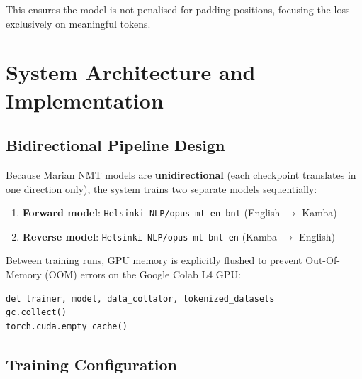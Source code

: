\documentclass[12pt,a4paper]{article}
\begin{document}
This ensures the model is not penalised for padding positions, focusing the loss exclusively on meaningful tokens.

\section{System Architecture and Implementation}

\subsection{Bidirectional Pipeline Design}

Because Marian NMT models are \textbf{unidirectional} (each checkpoint translates in one direction only), the system trains two separate models sequentially:

\begin{enumerate}
    \item \textbf{Forward model}: \texttt{Helsinki-NLP/opus-mt-en-bnt} (English $\rightarrow$ Kamba)
    \item \textbf{Reverse model}: \texttt{Helsinki-NLP/opus-mt-bnt-en} (Kamba $\rightarrow$ English)
\end{enumerate}

Between training runs, GPU memory is explicitly flushed to prevent Out-Of-Memory (OOM) errors on the Google Colab L4 GPU:

\begin{lstlisting}
del trainer, model, data_collator, tokenized_datasets
gc.collect()
torch.cuda.empty_cache()
\end{lstlisting}

\subsection{Training Configuration}
\end{document}
